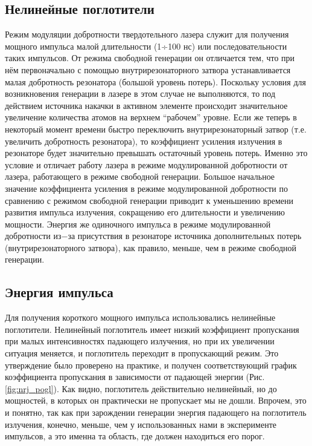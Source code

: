 \documentclass[twocolumn]{article}
\begin{document}
\subsection{Нелинейные поглотители}
Режим модуляции добротности твердотельного лазера служит для получения
мощного импульса малой длительности (1÷100 нс) или последовательности
таких импульсов. От режима свободной генерации он отличается тем, что
при нём первоначально с помощью внутрирезонаторного затвора
устанавливается малая добротность резонатора (большой уровень потерь).
Поскольку условия для возникновения генерации в лазере в этом случае не
выполняются, то под действием источника накачки в активном элементе
происходит значительное увеличение количества атомов на верхнем
``рабочем'' уровне. Если же теперь в некоторый момент времени быстро
переключить внутрирезонаторный затвор (т.е. увеличить добротность
резонатора), то коэффициент усиления излучения в резонаторе будет
значительно превышать остаточный уровень потерь. Именно это условие и
отличает работу лазера в режиме модулированной добротности от лазера,
работающего в режиме свободной генерации. Большое начальное значение
коэффициента усиления в режиме модулированной добротности по сравнению с
режимом свободной генерации приводит к уменьшению времени развития
импульса излучения, сокращению его длительности и увеличению мощности.
Энергия же одиночного импульса в режиме модулированной добротности из−за
присутствия в резонаторе источника дополнительных потерь
(внутрирезонаторного затвора), как правило, меньше, чем в режиме
свободной генерации.

\subsection{Энергия импульса}

Для получения короткого мощного импульса использовались нелинейные
поглотители. Нелинейный поглотитель имеет низкий коэффициент пропускания при малых интенсивностях падающего излучения, но при их увеличении ситуация меняется, и поглотитель переходит в пропускающий режим. Это утверждение было проверено на практике, и получен соответствующий график коэффициента пропускания в зависимости от падающей энергии (Рис. \ref{fig:nrj_pogl}). Как видно, поглотитель действительно нелинейный, но до мощностей, в которых он практически не пропускает мы не дошли. Впрочем, это и понятно, так как при зарождении генерации энергия падающего на поглотитель излучения, конечно, меньше, чем у использованных нами в эксперименте импульсов, а это именна та область, где должен находиться его порог.
\end{document}
